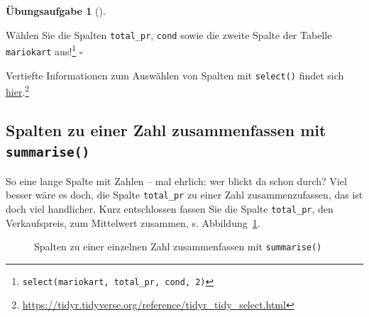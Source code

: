 \documentclass[
  letterpaper,
]{scrbook}
\theoremstyle{definition}
\newtheorem{exercise}{Übungsaufgabe}[chapter]
\theoremstyle{definition}
\theoremstyle{definition}
\theoremstyle{remark}
\begin{document}
\begin{exercise}[]\protect\hypertarget{exr-select}{}\label{exr-select}

Wählen Sie die Spalten \texttt{total\_pr}, \texttt{cond} sowie die
zweite Spalte der Tabelle \texttt{mariokart} aus!\footnote{\texttt{select(mariokart,\ total\_pr,\ cond,\ 2)}}
\(\square\)

\end{exercise}

Vertiefte Informationen zum Auswählen von Spalten mit \texttt{select()}
findet sich
\href{https://tidyr.tidyverse.org/reference/tidyr_tidy_select.html}{hier}.\footnote{\url{https://tidyr.tidyverse.org/reference/tidyr_tidy_select.html}}

\subsection{\texorpdfstring{Spalten zu einer Zahl zusammenfassen mit
\texttt{summarise()}}{Spalten zu einer Zahl zusammenfassen mit summarise()}}\label{spalten-zu-einer-zahl-zusammenfassen-mit-summarise}

So eine lange Spalte mit Zahlen -- mal ehrlich: wer blickt da schon
durch? Viel besser wäre es doch, die Spalte \texttt{total\_pr} zu einer
Zahl zusammenzufassen, das ist doch viel handlicher. Kurz entschlossen
fassen Sie die Spalte \texttt{total\_pr}, den Verkaufspreis, zum
Mittelwert zusammen, s. Abbildung~\ref{fig-summarise}.

\begin{figure}


\caption{\label{fig-summarise}Spalten zu einer einzelnen Zahl
zusammenfassen mit \texttt{summarise()}}

\end{figure}%
\end{document}
